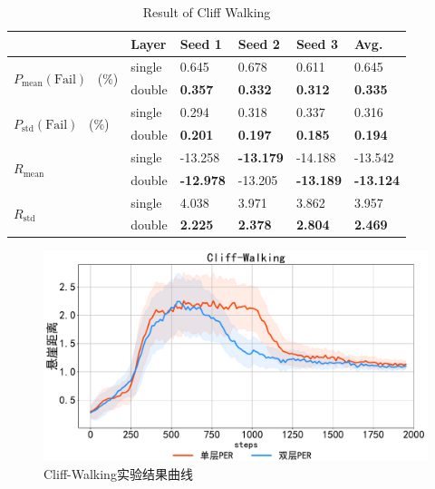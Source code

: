 \begin{table}[ht]
\centering
\begin{tabular}{l|l|l|l|l|l} 
\toprule
                                                    & Layer  & Seed 1           & Seed 2           & Seed 3           & Avg.              \\ 
\hline
\multirow{2}{*}{$P_\text{mean}(\text{Fail})$~ (\%)} & single & 0.645            & 0.678            & 0.611            & 0.645             \\ 
\cline{2-6}
                                                    & double & \textbf{0.357}   & \textbf{0.332}   & \textbf{0.312}   & \textbf{0.335}    \\ 
\hline
\multirow{2}{*}{$P_\text{std}(\text{Fail})$~ (\%)}  & single & 0.294            & 0.318            & 0.337            & 0.316             \\ 
\cline{2-6}
                                                    & double & \textbf{0.201}   & \textbf{0.197}   & \textbf{0.185}   & \textbf{0.194}    \\ 
\hline
\multirow{2}{*}{$R_\text{mean}$}                    & single & -13.258          & \textbf{-13.179} & -14.188          & -13.542           \\ 
\cline{2-6}
                                                    & double & \textbf{-12.978} & -13.205          & \textbf{-13.189} & \textbf{-13.124}  \\ 
\hline
\multirow{2}{*}{$R_\text{std}$}                     & single & 4.038            & 3.971            & 3.862            & 3.957             \\ 
\cline{2-6}
                                                    & double & \textbf{2.225}   & \textbf{2.378}   & \textbf{2.804}   & \textbf{2.469}    \\
\bottomrule
\end{tabular}
\caption{Result of Cliff Walking}
\label{tab:cliff-stats}
\end{table}

\begin{figure}[t]
\centering
\includegraphics[width=\textwidth]{figures/cliffwalking.pdf}
\caption{Cliff-Walking实验结果曲线}
\label{fig:cliff-dis}
\end{figure}

